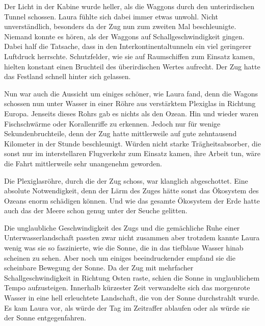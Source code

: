 \par

Der Licht in der Kabine wurde heller, als die Waggons durch den unterirdischen Tunnel schossen. Laura fühlte sich dabei immer etwas unwohl. Nicht unverständlich, besonders da der Zug nun zum zweiten Mal beschleunigte. Niemand konnte es hören, als der Waggons auf Schallgeschwindigkeit gingen. Dabei half die Tatsache, dass in den Interkontinentaltunneln ein viel geringerer Luftdruck herrschte. Schutzfelder, wie sie auf Raumschiffen zum Einsatz kamen, hielten konstant einen Bruchteil des überirdischen Wertes aufrecht. Der Zug hatte das Festland schnell hinter sich gelassen.

\par

Nun war auch die Aussicht um einiges schöner, wie Laura fand, denn die Wagons schossen nun unter Wasser in einer Röhre aus verstärktem Plexiglas in Richtung Europa. Jenseits dieses Rohrs gab es nichts als den Ozean. Hin und wieder waren Fischschwärme oder Korallenriffe zu erkennen. Jedoch nur für wenige Sekundenbruchteile, denn der Zug hatte mittlerweile auf gute zehntausend Kilometer in der Stunde beschleunigt. Würden nicht starke Trägheitsabsorber, die sonst nur im interstellaren Flugverkehr zum Einsatz kamen, ihre Arbeit tun, wäre die Fahrt mittlerweile sehr unangenehm geworden.

\par

Die Plexiglasröhre, durch die der Zug schoss, war klanglich abgeschottet. Eine absolute Notwendigkeit, denn der Lärm des Zuges hätte sonst das Ökosystem des Ozeans enorm schädigen können. Und wie das gesamte Ökosystem der Erde hatte auch das der Meere schon genug unter der Seuche gelitten.

\par

Die unglaubliche Geschwindigkeit des Zugs und die gemächliche Ruhe einer Unterwasserlandschaft passten zwar nicht zusammen aber trotzdem kannte Laura wenig was sie so faszinierte, wie die Sonne, die in das tiefblaue Wasser hinab scheinen zu sehen. Aber noch um einiges beeindruckender empfand sie die scheinbare Bewegung der Sonne. Da der Zug mit mehrfacher Schallgeschwindigkeit in Richtung Osten raste, schien die Sonne in unglaublichem Tempo aufzusteigen. Innerhalb kürzester Zeit verwandelte sich das morgenrote Wasser in eine hell erleuchtete Landschaft, die von der Sonne durchstrahlt wurde. Es kam Laura vor, als würde der Tag im Zeitraffer ablaufen oder als würde sie der Sonne entgegenfahren.

